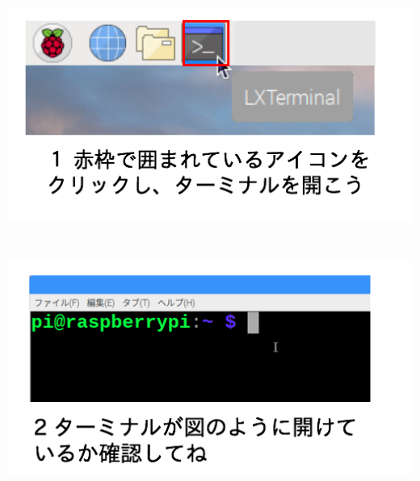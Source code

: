 \documentclass[a4paper,12pt,dvipdfmx]{jarticle}
\begin{document}
\centering
\includegraphics[width=14.981cm,height=7.915cm]{ome7-img007.png}

\centering
\includegraphics[width=14.508cm,height=7.675cm]{ome7-img008.png}
\flushleft


\clearpage





\centering
\end{document}
